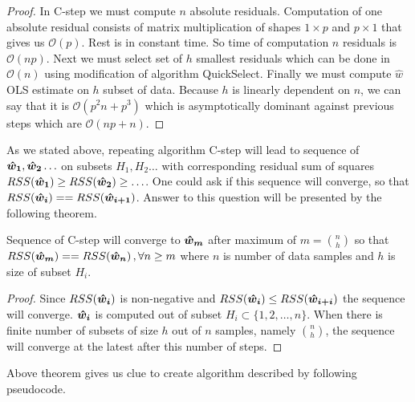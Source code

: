 \begin{proof}
	In C-step we must compute $n$ absolute residuals. Computation of one absolute residual consists of
	matrix multiplication of shapes $1 \times p$ and $p \times 1$ that gives us $\mathcal{O}(p)$. Rest is in constant time.
	So time of computation $n$ residuals is $\mathcal{O}(np)$.
	Next we must select set of $h$ smallest residuals which can be done in $\mathcal{O}(n)$ using modification of algorithm QuickSelect.  
	Finally we must compute $\hat{w}$ OLS estimate on $h$ subset of data.
	Because $h$ is linearly dependent on $n$, we can say that it is $\mathcal{O}(p^2n + p^3)$ which 
	is asymptotically dominant against previous steps which are $\mathcal{O}(np + n)$.
\end{proof}

As we stated above, repeating algorithm C-step will lead to sequence of $\boldsymbol{\hat{w}_1}, \boldsymbol{\hat{w}_2} \ldots$ 
on subsets $H_1, H_2 \ldots$ with corresponding residual sum of squares
$RSS(\boldsymbol{\hat{w}_{1}}) \geq RSS(\boldsymbol{\hat{w}_{2}}) \geq \ldots$. One could ask if this sequence will converge, so that
$RSS(\boldsymbol{\hat{w}_{i}}) == RSS(\boldsymbol{\hat{w}_{i+1}})$. 
Answer to this question will be presented by the following theorem.


\begin{theorem}
	Sequence of C-step will converge to $\boldsymbol{\hat{w}_{m}}$ after maximum of $m = {n \choose h}$
	so that $RSS(\boldsymbol{\hat{w}_{m}}) == RSS(\boldsymbol{\hat{w}_{n}})\,, \forall n\geq m$ where $n$ is number of data samples 
	and $h$ is size of subset $H_i$.
\end{theorem}

\begin{proof}
	Since  $RSS(\boldsymbol{\hat{w}_{i}})$ is non-negative and $RSS(\boldsymbol{\hat{w}_{i}}) \leq RSS(\boldsymbol{\hat{w}_{i+i}})$ the 
	sequence will converge. $\boldsymbol{\hat{w}_{i}}$  is computed out of subset 
	$H_i \subset \{{1,2,\ldots,n\}}$. When there is finite number of subsets of size $h$ out of $n$ samples, namely ${n \choose h}$, the sequence will converge at the latest after this number of steps.
\end{proof}

Above theorem gives us clue to create algorithm described by following pseudocode.

